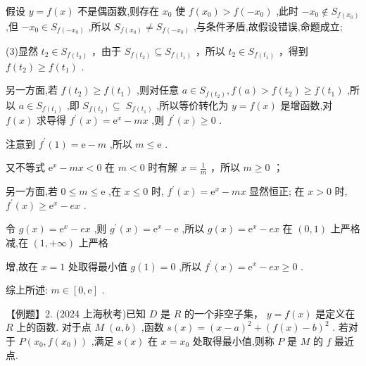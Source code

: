 \documentclass[10pt]{article}
\begin{document}
假设 \(y = f\left( x\right)\) 不是偶函数,则存在 \({x}_{0}\) 使 \(f\left( {x}_{0}\right)  > f\left( {-{x}_{0}}\right)\) ,此时 \(- {x}_{0} \notin  {S}_{f\left( {x}_{0}\right) }\) ,但 \(- {x}_{0} \in  {S}_{f\left( {-{x}_{0}}\right) }\) ,所以 \({S}_{f\left( {x}_{0}\right) } \neq  {S}_{f\left( {-{x}_{0}}\right) }\) ,与条件矛盾,故假设错误,命题成立;

(3)显然 \({t}_{2} \in  {S}_{f\left( {t}_{2}\right) }\) ，由于 \({S}_{f\left( {t}_{2}\right) } \subseteq  {S}_{f\left( {t}_{1}\right) }\) ，所以 \({t}_{2} \in  {S}_{f\left( {t}_{1}\right) }\) ，得到 \(f\left( {t}_{2}\right)  \geq  f\left( {t}_{1}\right)\) .

另一方面,若 \(f\left( {t}_{2}\right)  \geq  f\left( {t}_{1}\right)\) ,则对任意 \(a \in  {S}_{f\left( {t}_{2}\right) },f\left( a\right)  > f\left( {t}_{2}\right)  \geq  f\left( {t}_{1}\right)\) ,所以 \(a \in  {S}_{f\left( {t}_{1}\right) }\) ,即 \({S}_{f\left( {t}_{2}\right) } \subseteq \; {S}_{f\left( {t}_{1}\right) }\) ,所以等价转化为 \(y = f\left( x\right)\) 是增函数,对 \(f\left( x\right)\) 求导得 \({f}^{\prime }\left( x\right)  = {\mathrm{e}}^{x} - {mx}\) ,则 \({f}^{\prime }\left( x\right)  \geq  0\) .

注意到 \({f}^{\prime }\left( 1\right)  = \mathrm{e} - m\) ,所以 \(m \leq  \mathrm{e}\) .

又不等式 \({\mathrm{e}}^{x} - {mx} < 0\) 在 \(m < 0\) 时有解 \(x = \frac{1}{m}\) ，所以 \(m \geq  0\) ；

另一方面,若 \(0 \leq  m \leq  \mathrm{e}\) ,在 \(x \leq  0\) 时, \({f}^{\prime }\left( x\right)  = {\mathrm{e}}^{x} - {mx}\) 显然恒正; 在 \(x > 0\) 时, \({f}^{\prime }\left( x\right)  \geq  {\mathrm{e}}^{x} - {ex}\) .

令 \(g\left( x\right)  = {\mathrm{e}}^{x} - {ex}\) ,则 \({g}^{\prime }\left( x\right)  = {\mathrm{e}}^{x} - \mathrm{e}\) ,所以 \(g\left( x\right)  = {\mathrm{e}}^{x} - {ex}\) 在 \(\left( {0,1}\right)\) 上严格减,在 \(\left( {1, + \infty }\right)\) 上严格

增,故在 \(x = 1\) 处取得最小值 \(g\left( 1\right)  = 0\) ,所以 \({f}^{\prime }\left( x\right)  = {\mathrm{e}}^{x} - {ex} \geq  0\) .

综上所述: \(m \in  \left\lbrack  {0,\mathrm{e}}\right\rbrack\) .

【例题】2. (2024 上海秋考)已知 \(D\) 是 \(R\) 的一个非空子集， \(y = f\left( x\right)\) 是定义在 \(R\) 上的函数. 对于点 \(M \; \left( {a,b}\right)\) ,函数 \(s\left( x\right)  = {\left( x - a\right) }^{2} + {\left( f\left( x\right)  - b\right) }^{2}\) . 若对于 \(P\left( {{x}_{0},f\left( {x}_{0}\right) }\right)\) ,满足 \(s\left( x\right)\) 在 \(x = {x}_{0}\) 处取得最小值,则称 \(P\) 是 \(M\) 的 \(f\) 最近点.
\end{document}
